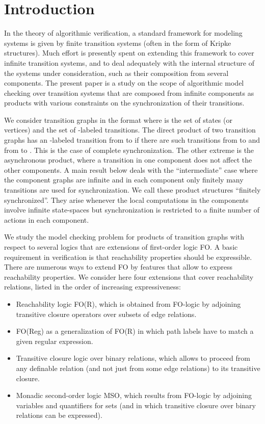 \documentclass{LMCS}
\begin{document}
\section{Introduction}

In the theory of algorithmic verification, a standard framework for 
modeling systems is given by finite transition systems (often in the form 
of Kripke structures). Much effort is presently spent on extending this framework 
to cover infinite transition systems, and to deal adequately with the 
internal structure of the systems under consideration, such as their 
composition from several components. The present paper is a study on 
the scope of algorithmic model checking over transition systems that 
are composed from infinite 
components as products with various constraints on the synchronization of 
their transitions. 
 





We consider transition graphs in the format 
where  is the set of states (or vertices) and  
the set of -labeled transitions. The direct product of two transition graphs has an -labeled transition from 
 to  if there are such transitions from  to  
and from  to . This is the case of complete synchronization. 
The other extreme is the asynchronous product, where a transition in one 
component does not affect the other components. A main result below deals 
with the ``intermediate'' case where the component graphs are infinite and 
in each component 
only finitely many transitions are used for synchronization. We call these product
structures ``finitely synchronized''. They arise whenever the local 
computations in the components involve infinite state-spaces but 
synchronization is restricted to a finite number of actions in each 
 component. 

We study the model checking problem for products of transition graphs 
with respect to several logics that are extensions of first-order logic FO.  
A basic requirement in verification is that reachability properties
should be expressible. There are numerous ways to extend FO by features
that allow to express reachability properties. We consider here four 
extensions that cover reachability relations, listed in the order 
of increasing expressiveness:

\begin{itemize}
\item Reachability logic FO(R), which is obtained from FO-logic by 
 adjoining transitive closure operators  over subsets  of 
 edge relations.
\item FO(Reg) as a generalization of FO(R) in which path labels have to match 
 a given regular expression.
\item Transitive closure logic over binary relations, which allows to proceed 
 from any definable relation (and not just from some edge relations) to 
 its transitive closure.
\item Monadic second-order logic MSO, which results from FO-logic by adjoining 
 variables and quantifiers for sets (and in which transitive closure over 
 binary relations can be expressed).
\end{itemize}
\end{document}
